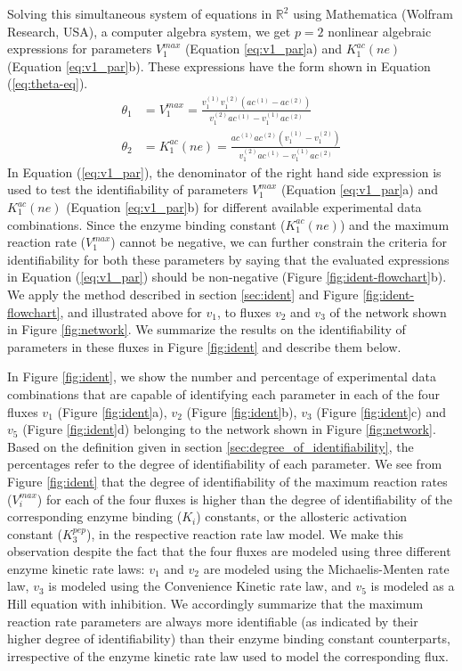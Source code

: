 \documentclass[10pt]{article}
\begin{document}
	Solving this simultaneous system of equations in $\mathbb{R}^2$ using Mathematica (Wolfram Research, USA), a computer algebra system, we get $p=2$ nonlinear algebraic expressions for parameters $V_1^{max}$ (Equation \ref{eq:v1_par}a) and $K_1^{ac}(ne)$ (Equation \ref{eq:v1_par}b). These expressions have the form shown in Equation (\ref{eq:theta-eq}).
	\begin{subequations}\label{eq:v1_par}
		\begin{align}		
		\theta_1 &= V_1^{max} = \frac{v_1^{(1)}v_1^{(2)}(ac^{(1)}-ac^{(2)})}{v_1^{(2)}ac^{(1)}-v_1^{(1)}ac^{(2)}}\\
		\theta_2 &= K_1^{ac}(ne) = \frac{ac^{(1)}ac^{(2)}(v_1^{(1)}-v_1^{(2)})}{v_1^{(2)}ac^{(1)}-v_1^{(1)}ac^{(2)}}
		\end{align}
	\end{subequations}
	In Equation (\ref{eq:v1_par}), the denominator of the right hand side expression is used to test the identifiability of parameters $V_1^{max}$ (Equation \ref{eq:v1_par}a) and $K_1^{ac}(ne)$ (Equation \ref{eq:v1_par}b) for different available experimental data combinations. Since the enzyme binding constant ($K_1^{ac}(ne)$) and the maximum reaction rate ($V_1^{max}$) cannot be negative, we can further constrain the criteria for identifiability for both these parameters by saying that the evaluated expressions in Equation (\ref{eq:v1_par}) should be non-negative (Figure \ref{fig:ident-flowchart}b). We apply the method described in section \ref{sec:ident} and Figure \ref{fig:ident-flowchart}, and illustrated above for $v_1$, to fluxes $v_2$ and $v_3$ of the network shown in Figure \ref{fig:network}. We summarize the results on the identifiability of parameters in these fluxes in Figure \ref{fig:ident} and describe them below.
	
	In Figure \ref{fig:ident}, we show the number and percentage of experimental data combinations that are capable of identifying each parameter in each of the four fluxes $v_1$ (Figure \ref{fig:ident}a), $v_2$ (Figure \ref{fig:ident}b), $v_3$ (Figure \ref{fig:ident}c) and $v_5$ (Figure \ref{fig:ident}d) belonging to the network shown in Figure \ref{fig:network}. Based on the definition given in section \ref{sec:degree_of_identifiability}, the percentages refer to the degree of identifiability of each parameter. We see from Figure \ref{fig:ident} that the degree of identifiability of the maximum reaction rates ($V_i^{max}$) for each of the four fluxes is higher than the degree of identifiability of the corresponding enzyme binding ($K_i$) constants, or the allosteric activation constant ($K_3^{pep}$), in the respective reaction rate law model. We make this observation despite the fact that the four fluxes are modeled using three different enzyme kinetic rate laws: $v_1$ and $v_2$ are modeled using the Michaelis-Menten rate law, $v_3$ is modeled using the Convenience Kinetic rate law, and $v_5$ is modeled as a Hill equation with inhibition. We accordingly summarize that the maximum reaction rate parameters are always more identifiable (as indicated by their higher degree of identifiability) than their enzyme binding constant counterparts, irrespective of the enzyme kinetic rate law used to model the corresponding flux.
	
\end{document}

